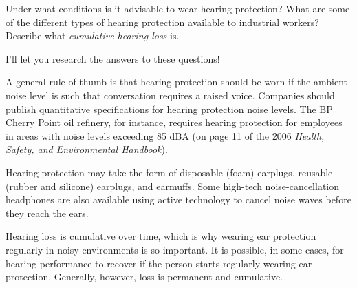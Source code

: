 

Under what conditions is it advisable to wear hearing protection?  What are some of the different types of hearing protection available to industrial workers?  Describe what {\it cumulative hearing loss} is.







I'll let you research the answers to these questions!







A general rule of thumb is that hearing protection should be worn if the ambient noise level is such that conversation requires a raised voice.  Companies should publish quantitative specifications for hearing protection noise levels.  The BP Cherry Point oil refinery, for instance, requires hearing protection for employees in areas with noise levels exceeding 85 dBA (on page 11 of the 2006 {\it Health, Safety, and Environmental Handbook}).

Hearing protection may take the form of disposable (foam) earplugs, reusable (rubber and silicone) earplugs, and earmuffs.  Some high-tech noise-cancellation headphones are also available using active technology to cancel noise waves before they reach the ears.

Hearing loss is cumulative over time, which is why wearing ear protection regularly in noisy environments is so important.  It is possible, in some cases, for hearing performance to recover if the person starts regularly wearing ear protection.  Generally, however, loss is permanent and cumulative.




